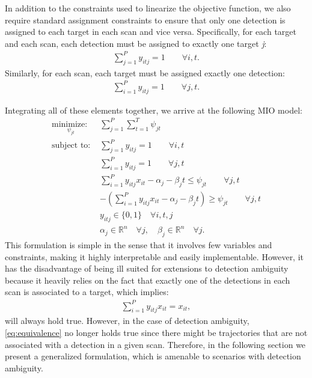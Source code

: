 In addition to the constraints used to linearize the objective function, we also require standard assignment constraints to ensure that only one detection is assigned to each target in each scan and vice versa. Specifically, for each target and each scan, each detection must be assigned to exactly one target \textit{j}:
\begin{align}\label{eq:all_detections}
\sum_{j=1}^{P} y_{itj} = 1 \qquad \forall i,t.
\end{align}
Similarly, for each scan, each target must be assigned exactly one detection:
\begin{align}\label{eq:all_targets}
\sum_{i=1}^{P} y_{itj} = 1 \qquad \forall j,t.
\end{align}

Integrating all of these elements together, we arrive at the following MIO model:
\begin{align}
\underset{\psi_{jt}}{\text{minimize: }} & \sum_{j=1}^{P} \sum_{t=1}^{T} \psi_{jt} \label{eq:simple_problem} \\
\text{subject to: }	& \sum_{j=1}^{P} y_{itj} = 1 \qquad \forall i,t\nonumber \\
				& \sum_{i=1}^{P} y_{itj} = 1 \qquad \forall j,t\nonumber \\
				& \sum_{i=1}^{P}y_{itj}x_{it} - \alpha_{j} - \beta_{j}t \leq \psi_{jt} \qquad \forall j,t \nonumber \\
				& -\left(\sum_{i=1}^{P}y_{itj}x_{it} - \alpha_{j} - \beta_{j}t\right) \geq \psi_{jt} \qquad \forall j,t \nonumber \\
			 	& y_{itj} \in \{0,1\} \quad \forall i,t,j \nonumber\\
				& \alpha_{j} \in \mathbb{R}^n \quad \forall j,\quad \beta_{j} \in \mathbb{R}^n \quad \forall j. \nonumber
\end{align}
This formulation is simple in the sense that it involves few variables and constraints, making it highly interpretable and easily implementable. However, it has the disadvantage of being ill suited for extensions to detection ambiguity because it heavily relies on the fact that exactly one of the detections in each scan is associated to a target, which implies:
\begin{align}\label{eq:equivalence}
\sum_{i=1}^{P}y_{itj}x_{it} = x_{it},
\end{align}
will always hold true. However, in the case of detection ambiguity, \eqref{eq:equivalence} no longer holds true since there might be trajectories that are not associated with a detection in a given scan. Therefore, in the following section we present a generalized formulation, which is amenable to scenarios with detection ambiguity.


